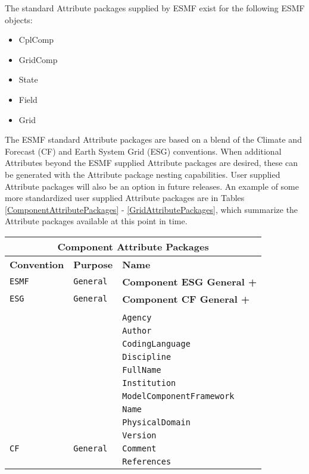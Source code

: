 The standard Attribute packages supplied by ESMF exist for the following ESMF objects:

\begin{itemize}
\item CplComp
\item GridComp
\item State
\item Field
\item Grid
\end{itemize}

The ESMF standard Attribute packages are based on a blend of the Climate and Forecast (CF) and Earth System Grid (ESG) conventions.  When additional Attributes beyond the ESMF supplied Attribute packages are desired, these can be generated with the Attribute package nesting capabilities.  User supplied Attribute packages will also be an option in future releases.  An example of some more standardized user supplied Attribute packages are in Tables \ref{ComponentAttributePackages} - \ref{GridAttributePackages}, which summarize the Attribute packages available at this point in time.

\vspace{18pt}

\begin{tabular}{|p{4cm}|p{4cm}|p{6cm}|}
\hline
\multicolumn{3}{|c|}{{\bf \large Component Attribute Packages}} \\
\hline\hline
{\bf Convention} & {\bf Purpose} & {\bf Name} \\
\hline\hline
{\tt ESMF} & {\tt General} & {\bf Component ESG General +} \\
{\tt ESG} & {\tt General} & {\bf Component CF General +} \\
     & & \\
     & & {\tt Agency} \\
     & & {\tt Author} \\
     & & {\tt CodingLanguage}  \\
     & & {\tt Discipline}  \\
     & & {\tt FullName} \\
     & & {\tt Institution} \\
     & & {\tt ModelComponentFramework} \\
     & & {\tt Name} \\
     & & {\tt PhysicalDomain}\\
     & & {\tt Version} \\ 
\hline
{\tt CF} & {\tt General} & {\tt Comment}\\
     & & {\tt References} \\
\hline
\end{tabular}
\label{ComponentAttributePackages}

